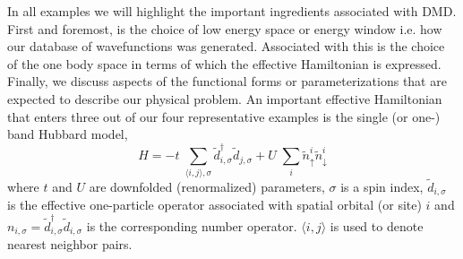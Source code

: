 In all examples we will highlight the important ingredients associated with DMD. First and foremost, is the choice 
of low energy space or energy window i.e. how our database of wavefunctions was generated. Associated with this is 
the choice of the one body space in terms of which the effective Hamiltonian is expressed. Finally, we discuss 
aspects of the functional forms or parameterizations that are expected to describe our physical 
problem. An important effective Hamiltonian that enters three out of our four representative examples is 
the single (or one-) band Hubbard model,
\begin{equation}
	H = -t \;\sum_{\langle i,j \rangle, \sigma} \tilde{d}_{i,\sigma}^{\dagger} \tilde{d}_{j,\sigma} + U \;\sum_{i} \tilde{n}^{i}_{\uparrow} \tilde{n}^{i}_{\downarrow}
\label{eq:oneband}
\end{equation}
where $t$ and $U$ are downfolded (renormalized) parameters, $\sigma$ is a spin index, 
$\tilde{d}_{i,\sigma}$ is the effective one-particle operator associated with spatial orbital (or site) $i$ 
and $n_{i,\sigma}=\tilde{d}_{i,\sigma}^{\dagger} \tilde{d}_{i,\sigma}$ is the corresponding number operator.
$\langle i,j \rangle$ is used to denote nearest neighbor pairs.

